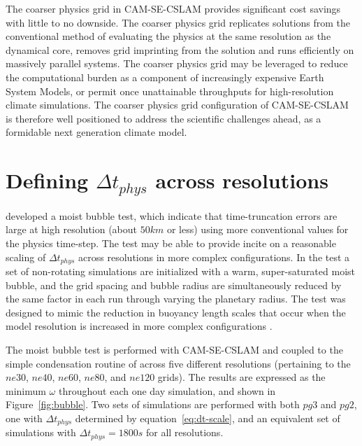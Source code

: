 \documentclass{agujournal}
\begin{document}
The coarser physics grid in CAM-SE-CSLAM provides significant cost savings with little to no downside. The coarser physics grid replicates solutions from the conventional method of evaluating the physics at the same resolution as the dynamical core, removes grid imprinting from the solution and runs efficiently on massively parallel systems. The coarser physics grid may be leveraged to reduce the computational burden as a component of increasingly expensive Earth System Models, or permit once unattainable throughputs for high-resolution climate simulations. The coarser physics grid configuration of CAM-SE-CSLAM is therefore well positioned to address the scientific challenges ahead, as a formidable next generation climate model.




%
%
%
%
\appendix
\section{Defining $\Delta t_{phys}$ across resolutions}\label{sec:app1}
 \cite{HR2018JAMES} developed a moist bubble test, which indicate that time-truncation errors are large at high resolution (about $50km$ or less) using more conventional values for the physics time-step. The test may be able to provide incite on a reasonable scaling of $\Delta t_{phys}$ across resolutions in more complex configurations. In the test a set of non-rotating simulations are initialized with a warm, super-saturated moist bubble, and the grid spacing and bubble radius are simultaneously reduced by the same factor in each run through varying the planetary radius. The test was designed to mimic the reduction in buoyancy length scales that occur when the model resolution is increased in more complex configurations \citep{HETAL2006JCLIM,HR2018JAMES}. 
 
The moist bubble test is performed with CAM-SE-CSLAM and coupled to the simple condensation routine of \cite{K1969MM} across five different resolutions (pertaining to the $ne30$, $ne40$, $ne60$, $ne80$, and $ne120$ grids). The results are expressed as the minimum $\omega$ throughout each one day simulation, and shown in Figure~\ref{fig:bubble}. Two sets of simulations are performed with both $pg3$ and $pg2$, one with $\Delta t_{phys}$ determined by equation~\eqref{eq:dt-scale}, and an equivalent set of simulations with $\Delta t_{phys} = 1800s$ for all resolutions. 
\end{document}
